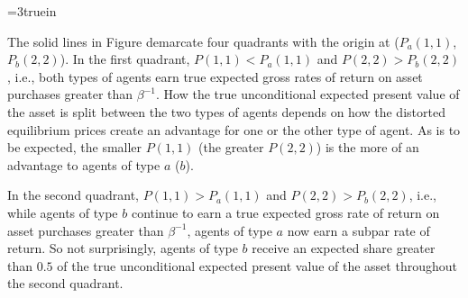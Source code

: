 \centerline{\epsfxsize=3truein}
\caption{Share of the true unconditional expected 
present value of the asset that agents of type $b$ 
are expected to receive, as a function of the true 
probabilities $P(1,1)$ and $P(2,2)$. The dashed curve 
is the isoquant for a share equal to $0.5$, and the 
solid lines demarcate four quadrants with the origin 
at the subjective beliefs $P_a(1,1)=0.5$ and 
$P_b(2,2)=0.75$.}
\endfigure

The solid lines in Figure  demarcate four
quadrants with the origin at ($P_a(1,1)$, $P_b(2,2)$).
In the first quadrant, $P(1,1)<P_a(1,1)$ and 
$P(2,2)>P_b(2,2)$, i.e., both types of agents earn true
expected gross rates of return on asset purchases 
greater than $\beta^{-1}$. How the true unconditional
expected present value of the asset is split between
the two types of agents depends on how the distorted equilibrium prices create an
advantage for one or the other type of agent. As is 
to be expected, the smaller $P(1,1)$ (the greater 
$P(2,2)$) is the more of an advantage to agents of 
type $a$ ($b$).

In the second quadrant, $P(1,1)>P_a(1,1)$ and 
$P(2,2)>P_b(2,2)$, i.e., while agents of type $b$
continue to earn a true expected gross rate of 
return on asset purchases greater than $\beta^{-1}$,
agents of type $a$ now earn a subpar rate of 
return. So not surprisingly, agents of type $b$
receive an expected share greater than $0.5$ of 
the true unconditional expected present value of 
the asset throughout the second quadrant.


